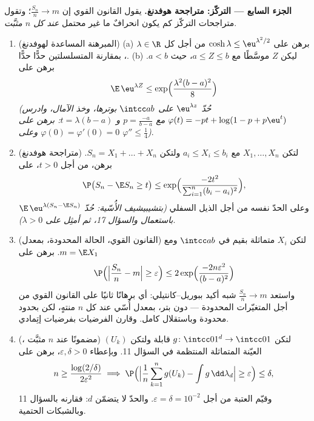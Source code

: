 \begin{problem}
\medskip
\noindent\textbf{الجزء السابع --- التركّز: متراجحة هوفدنغ.}
يقول القانون القوي إن $\frac{S_n}n \to m$؛ وتقول متراجحات التركّز كم يكون
انحرافٌ ما غير محتمل \emph{عند كل $n$ مثبَّت}.
\begin{enumerate}[resume]
  \item (المبرهنة المساعدة لهوفدنغ)
        (a) برهن على $\cosh\lambda \leq \eu^{\lambda^2/2}$ من أجل كل $\lambda \in \R$،
        بمقارنة المتسلسلتين حدًّا حدًّا.
        (b) ليكن $Z$ موسَّطًا مع $a \leq Z \leq b$، حيث $a < b$. برهن على
        \[
        \E\,\eu^{\lambda Z} \leq
        \exp\Bigl(\frac{\lambda^2(b - a)^2}8\Bigr)
        \]
        \emph{(حُدّ $\eu^{\lambda z}$ على $\intcc ab$ بوترها، وخذ
        الآمال، وادرس $\varphi(t)
        = -pt + \log(1 - p + p\eu^t)$ مع $p =
        \frac{-a}{b-a}$ و $t = \lambda(b - a)$: برهن على
        $\varphi(0) = \varphi'(0) = 0$ وعلى $\varphi''
        \leq \frac14$)}.
  \item (متراجحة هوفدنغ) لتكن $X_1, \dots, X_n$  مع $a_i \leq X_i \leq b_i$ ولتكن
        $S_n =
        X_1 + \dots + X_n$. برهن، من أجل $t > 0$، على
        \[
        \P\bigl(S_n - \E S_n \geq t\bigr) \leq
        \exp\Bigl(\frac{-2t^2}{\sum_{i=1}^n(b_i -
        a_i)^2}\Bigr),
        \]
        وعلى الحدّ نفسه من أجل الذيل السفلي \emph{(بتشيبيشيف
        الأُسّية: حُدّ $\E\,\eu^{\lambda(S_n - \E S_n)}$ باستعمال  والسؤال 17،
        ثم أمثِل على $\lambda > 0$)}.
  \item (القانون القوي، الحالة المحدودة، بمعدل) لتكن $X_i$
         متماثلة بقيم في $\intcc ab$ ومع $m
        = \E X_1$. برهن
        على
        \[
        \P\Bigl(\Bigl|\frac{S_n}n - m\Bigr| \geq
        \varepsilon\Bigr) \leq
        2\exp\Bigl(\frac{-2n\varepsilon^2}{(b - a)^2}\Bigr)
        \]
        واستعد $\frac{S_n}n \to m$ شبه أكيد ببوريل--كانتيلي: أي برهانًا
        ثانيًا على القانون القوي من أجل المتغيّرات المحدودة ---
        دون بتر، بمعدل أُسّي عند كل $n$ منتهٍ، لكن بحدود محدودة
        وباستقلال كامل. وقارن الفرضيات بفرضيات إتِمادي.
  \item (، مضمونًا عند $n$ مثبَّت) لتكن $g
        \colon \intcc01^d \to \intcc01$
        قابلة  ولتكن $(U_k)$ العيّنة  المتماثلة
        المنتظمة في السؤال 11. وبإعطاء $\varepsilon, \delta > 0$، برهن على
        \[
        n \geq \frac{\log(2/\delta)}{2\varepsilon^2}
        \implies
        \P\Bigl(\Bigl|\frac1n\sum_{k=1}^ng(U_k) -
        \int g\,\dd\lambda_d\Bigr| \geq \varepsilon\Bigr)
        \leq \delta,
        \]
        وقيّم العتبة من أجل $\varepsilon =
        \delta = 10^{-2}$. والحدّ لا يتضمّن $d$:
        فقارنه بالسؤال 11 وبالشبكات الحتمية.
\end{enumerate}


\end{problem}
